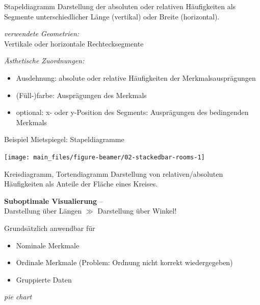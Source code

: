 \documentclass[
  10pt,
  ignorenonframetext,
]{beamer}
\providecommand{\tightlist}{%
  \setlength{\itemsep}{0pt}\setlength{\parskip}{0pt}}
\begin{document}
\begin{frame}{Stapeldiagramm}
\label{stapeldiagramm-1}
Darstellung der absoluten oder relativen Häufigkeiten als Segmente
unterschiedlicher Länge (vertikal) oder Breite (horizontal).

\emph{verwendete Geometrien:}\\
Vertikale oder horizontale Rechtecksegmente

\emph{Ästhetische Zuordnungen:}

\begin{itemize}
\tightlist
\item
  Ausdehnung: absolute oder relative Häufigkeiten der
  Merkmalsausprägungen
\item
  (Füll-)farbe: Ausprägungen des Merkmals
\item
  optional: x- oder y-Position des Segments: Ausprägungen des
  bedingenden Merkmals
\end{itemize}
\end{frame}

\begin{frame}{Beispiel Mietspiegel: Stapeldiagramme}
\label{beispiel-mietspiegel-stapeldiagramme}
\scriptsize

\begin{center}\texttt{[image: main\_files/figure-beamer/02-stackedbar-rooms-1]} \end{center}

\normalsize
\end{frame}

\begin{frame}{Kreisdiagramm, Tortendiagramm}
\label{kreisdiagramm-tortendiagramm}
Darstellung von relativen/absoluten Häufigkeiten als Anteile der Fläche
eines Kreises.

\textbf{Suboptimale Visualierung} --\\
Darstellung über Längen \(\gg\) Darstellung über Winkel!

Grundsätzlich anwendbar für

\begin{itemize}
\tightlist
\item
  Nominale Merkmale
\item
  Ordinale Merkmale (Problem: Ordnung nicht korrekt wiedergegeben)
\item
  Gruppierte Daten
\end{itemize}

\scriptsize

\emph{pie chart}
\end{frame}
\end{document}
